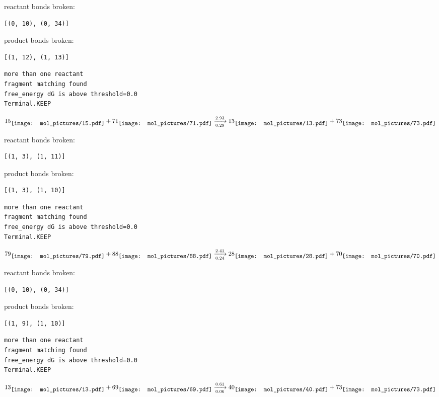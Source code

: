 \documentclass{article}
\begin{document}
reactant bonds broken:\begin{verbatim}
[(0, 10), (0, 34)]
\end{verbatim}
product bonds broken:\begin{verbatim}
[(1, 12), (1, 13)]
\end{verbatim}




\vspace{1cm}
\begin{verbatim}
more than one reactant
fragment matching found
free_energy dG is above threshold=0.0
Terminal.KEEP
\end{verbatim}
$$
15
\raisebox{-.5\height}{\texttt{[image: mol\_pictures/15.pdf]}}
+
71
\raisebox{-.5\height}{\texttt{[image: mol\_pictures/71.pdf]}}
\xrightarrow[0.29]{2.93}
13
\raisebox{-.5\height}{\texttt{[image: mol\_pictures/13.pdf]}}
+
73
\raisebox{-.5\height}{\texttt{[image: mol\_pictures/73.pdf]}}
$$


reactant bonds broken:\begin{verbatim}
[(1, 3), (1, 11)]
\end{verbatim}
product bonds broken:\begin{verbatim}
[(1, 3), (1, 10)]
\end{verbatim}




\vspace{1cm}
\begin{verbatim}
more than one reactant
fragment matching found
free_energy dG is above threshold=0.0
Terminal.KEEP
\end{verbatim}
$$
79
\raisebox{-.5\height}{\texttt{[image: mol\_pictures/79.pdf]}}
+
88
\raisebox{-.5\height}{\texttt{[image: mol\_pictures/88.pdf]}}
\xrightarrow[0.24]{2.41}
28
\raisebox{-.5\height}{\texttt{[image: mol\_pictures/28.pdf]}}
+
70
\raisebox{-.5\height}{\texttt{[image: mol\_pictures/70.pdf]}}
$$


reactant bonds broken:\begin{verbatim}
[(0, 10), (0, 34)]
\end{verbatim}
product bonds broken:\begin{verbatim}
[(1, 9), (1, 10)]
\end{verbatim}




\vspace{1cm}
\begin{verbatim}
more than one reactant
fragment matching found
free_energy dG is above threshold=0.0
Terminal.KEEP
\end{verbatim}
$$
13
\raisebox{-.5\height}{\texttt{[image: mol\_pictures/13.pdf]}}
+
69
\raisebox{-.5\height}{\texttt{[image: mol\_pictures/69.pdf]}}
\xrightarrow[0.06]{0.61}
40
\raisebox{-.5\height}{\texttt{[image: mol\_pictures/40.pdf]}}
+
73
\raisebox{-.5\height}{\texttt{[image: mol\_pictures/73.pdf]}}
$$
\end{document}
